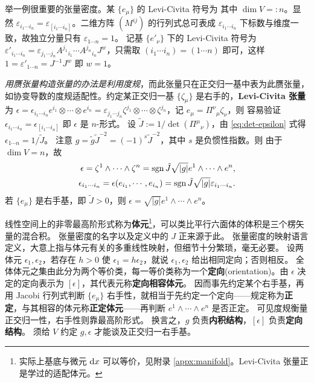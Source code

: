 举一例很重要的张量密度。某 $\{e_\mu\}$ 的 Levi-Civita 符号为
其中 $\dim V=:n$。显然 $\varepsilon_{i_1\cdots i_n}=\varepsilon_{[i_1\cdots i_n]}$。二维方阵 $(M^{ij})$ 的行列式总可表成
$\varepsilon_{i_1\cdots i_n}$ 下标数与维度一致，故独立分量只有 $\varepsilon_{1\cdots n}=1$。
记基 $\{e'_\nu\}$ 下的 Levi-Civita 符号为 $\varepsilon'_{i_1\cdots i_n}=\varepsilon_{j_1\cdots j_n} A^{j_1}{}_{i_1} \cdots A^{j_n}{}_{i_n} J^w$，只需取 $(i_1\cdots i_n)=(1\cdots n)$ 即可，这样 $1=\varepsilon'_{1\cdots n}=J^{-1} J^w$ 即 $w=1$。

\textit{用赝张量构造张量的办法是利用度规}，而此张量只在正交归一基中表为此赝张量，如协变导数的度规适配性。约定某正交归一基 $\{\zeta_\mu\}$ 是右手的，\textbf{Levi-Civita 张量}为 $\epsilon=\epsilon_{i_1\cdots i_n} e^{i_1}\otimes\cdots\otimes e^{i_n}=\varepsilon_{j_1\cdots j_n} \zeta^{j_1}\otimes\cdots\otimes \zeta^{j_n}$，记 $e_\mu=\Pi^\nu{ }_\mu \zeta_\nu$，则
容易验证 $\epsilon_{i_1\cdots i_n}=\epsilon_{[i_1\cdots i_n]}$ 即 $\epsilon$ 是 $n$-形式。
设 $\tilde J:=1/\det(\Pi^\mu{}_\nu)$，由 \eqref{eq:det-epsilon} 式得 $\epsilon_{1\cdots n}=1/\tilde J$。
注意 $g=\tilde g\tilde J^{-2}=(-1)^s\tilde J^{-2}$，其中 $s$ 是负惯性指数。则
由于 $\dim V=n$，故
\begin{align}
    \epsilon=\zeta^{1}\wedge\cdots\wedge \zeta^{n}=\operatorname{sgn}\tilde J\sqrt{|g|}e^{1}\wedge\cdots\wedge e^{n},\\
    \epsilon_{i_1\cdots i_n}=\epsilon(e_{i_1},\cdots,e_{i_n})=\operatorname{sgn}\tilde J\sqrt{|g|}\varepsilon_{i_1\cdots i_n}.
\end{align}
若 $\{e_\mu\}$ 是右手基，即 $\tilde J>0$，则 $\epsilon=\sqrt{|g|}e^{1}\wedge\cdots\wedge e^{n}$。

线性空间上的非零最高阶形式称为\textbf{体元}\footnote{实际上基底与微元 $\dd x$ 可以等价，见附录 \ref{appx:manifold}。Levi-Civita 张量正是学过的适配体元。}，可以类比平行六面体的体积是三个楞矢量的混合积。
张量密度的名字以及定义中的 $J$ 正来源于此。
张量密度的映射语言定义，大意上指与体元有关的多重线性映射，但细节十分繁琐，毫无必要。
设两体元 $\epsilon_1,\epsilon_2$，若存在 $h>0$ 使 $\epsilon_1=h\epsilon_2$，就说 $\epsilon_1,\epsilon_2$ 给出相同定向；否则相反。
全体体元之集由此分为两个等价类，每一等价类称为一个\textbf{定向}(orientation)。由 $\epsilon$ 决定的定向表示为 $[\epsilon]$，其代表元称\textbf{定向相容体元}。
因而事先约定某个右手基，再用 Jacobi 行列式判断 $\{e_\mu\}$ 右手性，就相当于先约定一个定向——规定称为\textbf{正定}，与其相容的体元称\textbf{正定体元}——再判断 $e^{1}\wedge\cdots\wedge e^{n}$ 是否正定。
可见度规衡量正交归一性，右手性则靠最高阶形式。
换言之，$g$ 负责\textbf{内积结构}，$[\epsilon]$ 负责\textbf{定向结构}。
须给 $V$ 约定 $g,\epsilon$ 才能谈及正交归一右手基。


